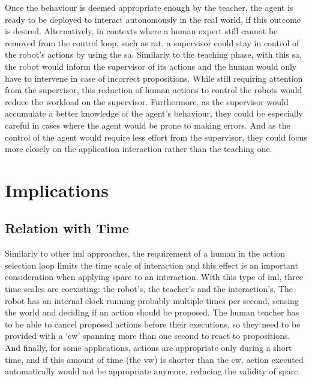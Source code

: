 Once the behaviour is deemed appropriate enough by the teacher, the agent is ready to be deployed to interact autonomously in the real world, if this outcome is desired. Alternatively, in contexts where a human expert still cannot be removed from the control loop, such as \gls{rat}, a supervisor could stay in control of the robot's actions by using the \gls{sa}. Similarly to the teaching phase, with this \gls{sa}, the robot would inform the supervisor of its actions and the human would only have to intervene in case of incorrect propositions. While still requiring attention from the supervisor, this reduction of human actions to control the robots would reduce the workload on the supervisor. Furthermore, as the supervisor would accumulate a better knowledge of the agent's behaviour, they could be especially careful in cases where the agent would be prone to making errors. And as the control of the agent would require less effort from the supervisor, they could focus more closely on the application interaction rather than the teaching one. 

\section{Implications}

\subsection{Relation with Time} \label{ssec:sparc_time}
Similarly to other \gls{iml} approaches, the requirement of a human in the action selection loop limits the time scale of interaction and this effect is an important consideration when applying \gls{sparc} to an interaction. With this type of \gls{iml}, three time scales are coexisting: the robot's, the teacher's and the interaction's. The robot has an internal clock running probably multiple times per second, sensing the world and deciding if an action should be proposed. The human teacher has to be able to cancel proposed actions before their executions, so they need to be provided with a `\gls{cw}' spanning more than one second to react to propositions. And finally, for some applications, actions are appropriate only during a short time, and if this amount of time (the \gls{vw}) is shorter than the \gls{cw}, action executed automatically would not be appropriate anymore, reducing the validity of \gls{sparc}.

